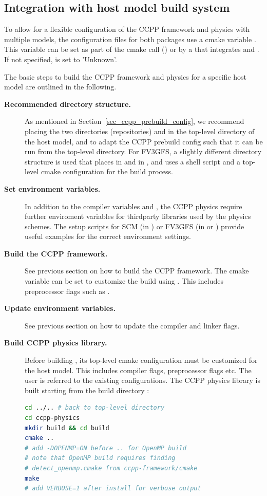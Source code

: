 \subsection{Integration with host model build system}
To allow for a flexible configuration of the CCPP framework and physics with multiple models, the  configuration files for both packages use a cmake variable . This variable can be set as part of the cmake call () or by a  that integrates  and . If not specified,  is set to 'Unknown'.

The basic steps to build the CCPP framework and physics for a specific host model are outlined in the following.
\begin{description}
\item[\textbf{Recommended directory structure.}] As mentioned in Section~\ref{sec_ccpp_prebuild_config}, we recommend placing the two directories (repositories)  and  in the top-level directory of the host model, and to adapt the CCPP prebuild config such that it can be run from the top-level directory. For FV3GFS, a slightly different directory structure is used that places  in  and  in , and uses a shell script  and a top-level cmake configuration  for the build process.
\item[\textbf{Set environment variables.}] In addition to the compiler variables  and , the CCPP physics require further enviroment variables for thirdparty libraries used by the physics schemes. The setup scripts for SCM (in ) or FV3GFS (in  or ) provide useful examples for the correct environment settings.
\item[\textbf{Build the CCPP framework.}] See previous section on how to build the CCPP framework. The cmake variable  can be set to customize the build using . This includes preprocessor flags such as .
\item[\textbf{Update environment variables.}] See previous section on how to update the compiler and linker flags.
\item[\textbf{Build CCPP physics library.}] Before building , its top-level cmake configuration  must be customized for the host model. This includes compiler flags, preprocessor flags etc. The user is referred to the existing configurations. The CCPP physics library is built starting from the build directory :
\begin{lstlisting}[language=bash]
cd ../.. # back to top-level directory
cd ccpp-physics
mkdir build && cd build
cmake ..
# add -DOPENMP=ON before .. for OpenMP build
# note that OpenMP build requires finding
# detect_openmp.cmake from ccpp-framework/cmake
make
# add VERBOSE=1 after install for verbose output
\end{lstlisting}
\end{description}
